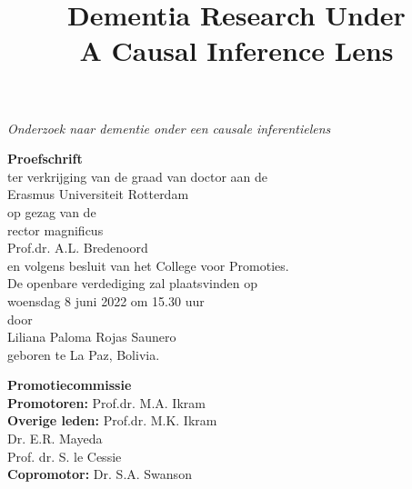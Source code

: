 \newpage
\thispagestyle{empty}
\begin{center}
\vspace{20mm}

\title{\textbf{\Large Dementia Research Under \\ \vspace{5mm} A Causal Inference Lens}}

\textit{\large Onderzoek naar dementie onder een causale inferentielens}

\vspace{10mm}
\textbf{\large{Proefschrift}}\\
\vspace{10mm}
ter verkrijging van de graad van doctor aan de\\
Erasmus Universiteit Rotterdam\\
op gezag van de\\
rector magnificus\\
\vspace{10mm}
Prof.dr. A.L. Bredenoord\\
\vspace{10mm}
en volgens besluit van het College voor Promoties.\\
De openbare verdediging zal plaatsvinden op\\
\vspace{10mm}
woensdag 8 juni 2022 om 15.30 uur\\
\vspace{10mm}
door\\
\vspace{10mm}
Liliana Paloma Rojas Saunero\\
geboren te La Paz, Bolivia. 
\end{center}


 

\newpage
\begin{flushleft}
\textbf{\large{Promotiecommissie}}\\
\vspace{10mm}
  \textbf{Promotoren:} \hspace{6mm} Prof.dr. M.A. Ikram \\
\vspace{10mm}
\textbf{Overige leden:} \hspace{3.5mm} Prof.dr. M.K. Ikram \\
\hspace{29mm} Dr. E.R. Mayeda \\
\hspace{29mm} Prof. dr. S. le Cessie\\
\vspace{10mm}
\textbf{Copromotor:} \hspace{6mm} Dr. S.A. Swanson\\
\end{flushleft}
\vspace*{\fill}



